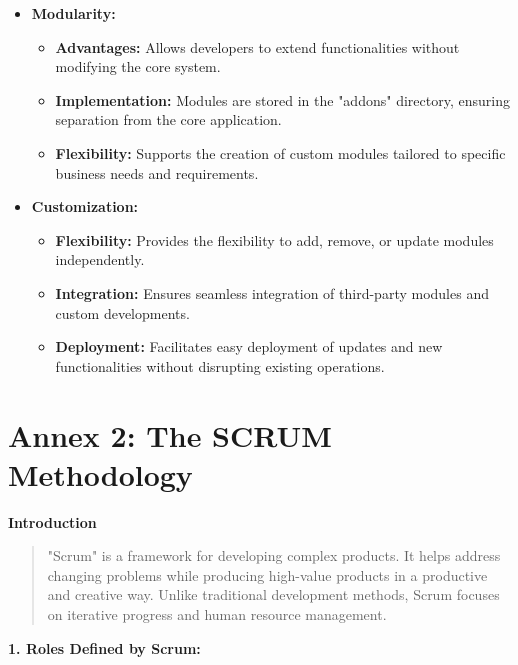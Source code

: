 \begin{itemize}
\item \textbf{Modularity:}
  \begin{itemize}
  \item \textbf{Advantages:} Allows developers to extend functionalities without modifying the core system.
  \item \textbf{Implementation:} Modules are stored in the "addons" directory, ensuring separation from the core application.
  \item \textbf{Flexibility:} Supports the creation of custom modules tailored to specific business needs and requirements.
  \end{itemize}
  
\item \textbf{Customization:}
  \begin{itemize}
  \item \textbf{Flexibility:} Provides the flexibility to add, remove, or update modules independently.
  \item \textbf{Integration:} Ensures seamless integration of third-party modules and custom developments.
  \item \textbf{Deployment:} Facilitates easy deployment of updates and new functionalities without disrupting existing operations.
  \end{itemize}
\end{itemize}
\newpage

\chapter*{\centering Annex 2: The SCRUM Methodology}
\thispagestyle{empty} 
\textbf{Introduction}

\begin{quote}
"Scrum" is a framework for developing complex products. It helps address changing problems while producing high-value products in a productive and creative way. Unlike traditional development methods, Scrum focuses on iterative progress and human resource management.
\end{quote}

\textbf{1. Roles Defined by Scrum:}

